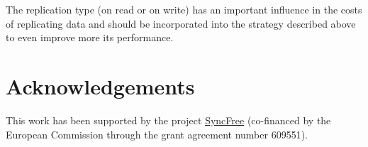 \documentclass{acm_proc_article-sp}
\begin{document}
The replication type (on read or on write) has an important influence in the costs of replicating data and should be incorporated into the strategy described above to even improve more its performance.


\section{Acknowledgements}
This work has been supported by the project \href{https://syncfree.lip6.fr}{SyncFree} (co-financed by the European Commission through the grant agreement number 609551).


%

%
%


\printglossaries
\end{document}
